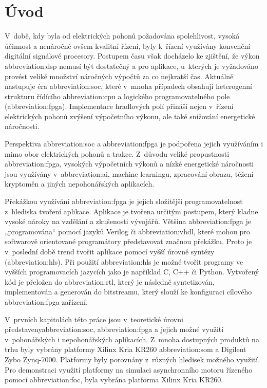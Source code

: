 \documentclass[a4paper, twoside, 11pt]{article}
\begin{document}
\section{Úvod}
V~době, kdy byla od elektrických pohonů požadována spolehlivost, vysoká účinnost a nenáročné ovšem kvalitní řízení, byly k~řízení využívány konvenční digitální signálové procesory. Postupem času však docházelo ke zjištění, že výkon \gls{abbreviation:dsp} nemusí být dostatečný a pro aplikace, u~kterých je vyžadováno provést veliké množství náročných výpočtů za co nejkratší čas. Aktuálně nastupuje éra \gls{abbreviation:soc}, které v~mnoha případech obsahují heterogenní strukturu řídícího \gls{abbreviation:cpu} a logického programovatelného pole (\gls{abbreviation:fpga}). Implementace hradlových polí přináší nejen v~řízení elektrických pohonů zvýšení výpočetního výkonu, ale také snižování energetické náročnosti.\par
Perspektiva \gls{abbreviation:soc} a \gls{abbreviation:fpga} je podpořena jejich využíváním i mimo obor elektrických pohonů a trakce. Z~důvodu veliké propustnosti \gls{abbreviation:fpga}, vysokých výpočetních výkonů a nízké energetické náročnosti jsou využívány v~\gls{abbreviation:ai}, machine learningu, zpracování obrazu, těžení kryptoměn a jiných nepohonářských aplikacích.\par
Překážkou využívání \gls{abbreviation:fpga} je jejich složitější programovatelnost z~hlediska tvoření aplikace. Aplikace je tvořena určitým postupem, který kladne vysoké nároky na vzdělání a zkušenosti vývojářů. Většina \gls{abbreviation:fpga} je „programována“ pomocí jazyků Verilog či \gls{abbreviation:vhdl}, které mohou pro softwarově orientované programátory představovat značnou překážku. Proto je v~poslední době trend tvořit aplikace pomocí vyšší úrovně syntézy (\gls{abbreviation:hls}). Při použití \gls{abbreviation:hls} je možné tvořit programy ve vyšších programovacích jazycích jako je například C, C++ či Python. Vytvořený kód je přeložen do \gls{abbreviation:rtl}, který je následně syntetizován, implementován a generován do bitstreamu, který slouží ke konfiguraci cílového \gls{abbreviation:fpga} zařízení.\par
V~prvních kapitolách této práce jsou v~teoretické úrovni představeny\gls{abbreviation:soc}, \gls{abbreviation:fpga} a jejich možné využití v~pohonářských i nepohonářských aplikacích. Z~mnoha dostupných produktů na trhu byly vybrány platformy Xilinx Kria KR260 \gls{abbreviation:som} a Digilent Zybo Zynq-7000. Platformy byly porovnány z~různých hledisek možného využití. Pro demonstraci využití platformy na simulaci asynchronního motoru řízeného pomocí \gls{abbreviation:foc}, byla vybrána platforma Xilinx Kria KR260.\par
\end{document}
